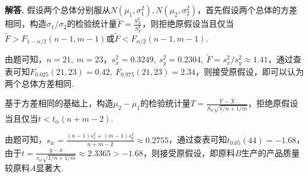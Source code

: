 \documentclass[12pt, a4paper, oneside]{ctexart}
\newenvironment{solution}[1][]{\par\noindent\textbf{#1解答. }}{\smallskip\par}  %
\begin{document}
\begin{solution}
    假设两个总体分别服从$N(\mu_1,\sigma_1^2),N(\mu_2,\sigma_2^2)$，首先假设两个总体的方差相同，构造$\sigma_1/\sigma_2$的检验统计量$\tilde{F} = \frac{S_X^2}{S_Y^2}$，则拒绝原假设当且仅当$\tilde{F} > F_{1-\alpha/2}(n-1,m-1)$或$\tilde{F} < F_{\alpha/2}(n-1,m-1)$.

    由题可知，$n=21,\ m=23$，$s_x^2 = 0.3249,\ s_y^2 = 0.2304,\ \tilde{F} = s_x^2/s_y^2 \approx 1.41$，通过查表可知$F_{0.025}(21, 23) = 0.42,\ F_{0.975}(21, 23) = 2.34$，则接受原假设，即可以认为两个总体方差相同.

    基于方差相同的基础上，构造$\mu_2-\mu_1$的检验统计量$T = \frac{\bar{Y}-\bar{X}}{S_w\sqrt{1/n+1/m}}$，拒绝原假设当且仅当$t < t_\alpha(n+m-2)$.
    
    由题可知，$s_w = \frac{(n-1)s_x^2+(m-1)s_y^2}{n+m-2} \approx 0.2755$，通过查表可知$t_{0.05}(44) = -1.68$，由于$t = \frac{\bar{y}-\bar{x}}{s_w\sqrt{1/n+1/m}} \approx 2.3365 > -1.68$，则接受原假设，即原料$B$生产的产品质量较原料$A$显著大.
\end{solution}
\end{document}
